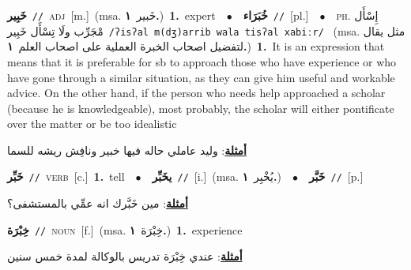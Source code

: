 \documentclass[10pt,a4paper,twoside]{article} %
\begin{document}
\begin{multicols}{2}
{{\setlength\topsep{0pt}\textbf{\foreignlanguage{arabic}{خَبِير}}\ {\color{gray}\texttt{//}\color{black}}\ \textsc{adj}\ [m.]\ \color{gray}(msa. \foreignlanguage{arabic}{خَبير}~\foreignlanguage{arabic}{\textbf{١.}})\color{black}\ \textbf{1.}~expert\ \ $\bullet$\ \ \setlength\topsep{0pt}\textbf{\foreignlanguage{arabic}{خُبَرَاء}}\ {\color{gray}\texttt{//}\color{black}}\ [pl.]\ \ $\bullet$\ \ \textsc{ph.} \color{gray} \foreignlanguage{arabic}{إِسْأَل مْجَرِّب ولَا تِسْأَل خَبِير}\color{black}\ {\color{gray}\texttt{/{\sffamily ʔisʔal m(dʒ)arrib wala tisʔal xabiːr}/}\color{black}}\ \color{gray} (msa. \foreignlanguage{arabic}{مثل يقال لتفضيل اصحاب الخبرة العملية على اصحاب العلم}~\foreignlanguage{arabic}{\textbf{١.}})\color{black}\ \textbf{1.}~It is an expression that means that it is preferable for sb to approach those who have experience or who have gone through a similar situation, as they can give him useful and workable advice. On the other hand, if the person who needs help approached a scholar (because he is knowledgeable), most probably, the scholar will either pontificate over the matter or be too idealistic\  \begin{flushright}\color{gray}\foreignlanguage{arabic}{\textbf{\underline{\foreignlanguage{arabic}{أمثلة}}}: وليد عاملي حاله فيها خبير ونافِش ريشه للسما}\end{flushright}\color{black}} \vspace{2mm}

{\setlength\topsep{0pt}\textbf{\foreignlanguage{arabic}{خَبِّر}}\ {\color{gray}\texttt{//}\color{black}}\ \textsc{verb}\ [c.]\ \textbf{1.}~tell\ \ $\bullet$\ \ \setlength\topsep{0pt}\textbf{\foreignlanguage{arabic}{يخَبِّر}}\ {\color{gray}\texttt{//}\color{black}}\ [i.]\ \color{gray}(msa. \foreignlanguage{arabic}{يُخْبِر}~\foreignlanguage{arabic}{\textbf{١.}})\color{black}\ \ $\bullet$\ \ \setlength\topsep{0pt}\textbf{\foreignlanguage{arabic}{خَبَّر}}\ {\color{gray}\texttt{//}\color{black}}\ [p.]\  \begin{flushright}\color{gray}\foreignlanguage{arabic}{\textbf{\underline{\foreignlanguage{arabic}{أمثلة}}}: مين خَبَّرك انه عمِّي بالمستشفى؟}\end{flushright}\color{black}} \vspace{2mm}

{\setlength\topsep{0pt}\textbf{\foreignlanguage{arabic}{خِبْرَة}}\ {\color{gray}\texttt{//}\color{black}}\ \textsc{noun}\ [f.]\ \color{gray}(msa. \foreignlanguage{arabic}{خِبْرَة}~\foreignlanguage{arabic}{\textbf{١.}})\color{black}\ \textbf{1.}~experience\  \begin{flushright}\color{gray}\foreignlanguage{arabic}{\textbf{\underline{\foreignlanguage{arabic}{أمثلة}}}: عندي خِبْرَة تدريس بالوكالة لمدة خمس سنين}\end{flushright}\color{black}} \vspace{2mm}

}
\end{multicols}
\end{document}
